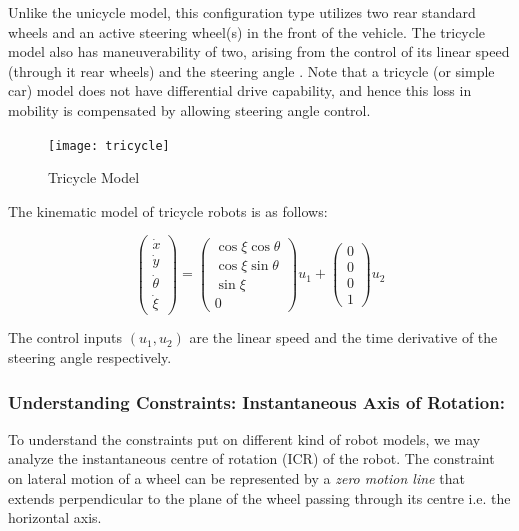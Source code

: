 \documentclass[twoside]{article}
\begin{document}
Unlike the unicycle model, this configuration type utilizes two rear standard wheels and an active steering wheel(s) in the front of the vehicle. The tricycle model also has maneuverability of two, arising from the control of its linear speed (through it rear wheels) and the steering angle \cite{sns}. Note that a tricycle (or simple car) model does not have differential drive capability, and hence this loss in mobility is compensated by allowing steering angle control.

\begin{figure}[H]
\centering
\texttt{[image: tricycle]}
\caption{Tricycle Model}
\end{figure}

The kinematic model of tricycle robots is as follows:

\[ \begin{pmatrix}
\dot{x} \\ \dot{y} \\ \dot{\theta} \\ \dot{\xi}
\end{pmatrix} =
\begin{pmatrix} \cos \xi \cos \theta \\ \cos \xi \sin \theta \\ \sin \xi \\ 0 \end{pmatrix} u_1 + \begin{pmatrix} 0 \\ 0 \\ 0 \\ 1 \end{pmatrix} u_2
\]

The control inputs $(u_1, u_2)$ are the linear speed and the time derivative of the steering angle respectively.


\subsubsection*{Understanding Constraints: Instantaneous Axis of Rotation:}


To understand the constraints put on different kind of robot models, we may analyze the instantaneous centre of rotation (ICR) of the robot. The constraint on lateral motion of a wheel can be represented by a \textit{zero motion line} that extends perpendicular to the plane of the wheel passing through its centre i.e. the horizontal axis. 
\end{document}
